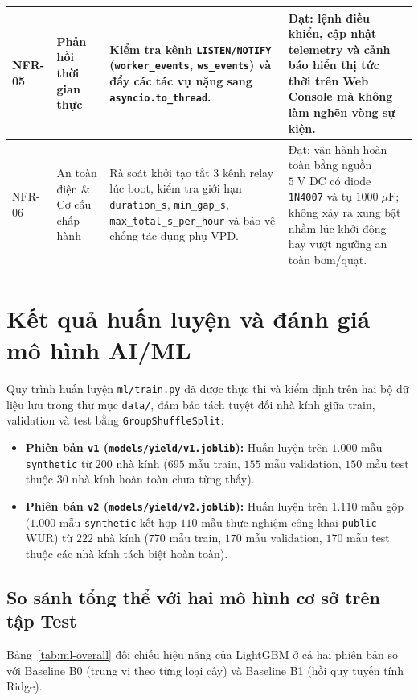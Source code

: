 \begin{longtable}{|>{\centering\arraybackslash}p{}|>{\raggedright\arraybackslash}p{}|>{\raggedright\arraybackslash}p{}|>{\raggedright\arraybackslash}p{}|}
NFR-05 & Phản hồi thời gian thực & Kiểm tra kênh \texttt{LISTEN/NOTIFY} (\texttt{worker\_events}, \texttt{ws\_events}) và đẩy các tác vụ nặng sang \texttt{asyncio.to\_thread}. & Đạt: lệnh điều khiển, cập nhật telemetry và cảnh báo hiển thị tức thời trên Web Console mà không làm nghẽn vòng sự kiện. \\ \hline
NFR-06 & An toàn điện \& Cơ cấu chấp hành & Rà soát khởi tạo tắt 3 kênh relay lúc boot, kiểm tra giới hạn \texttt{duration\_s}, \texttt{min\_gap\_s}, \texttt{max\_total\_s\_per\_hour} và bảo vệ chống tác dụng phụ VPD. & Đạt: vận hành hoàn toàn bằng nguồn \(5\;\text{V DC}\) có diode \texttt{1N4007} và tụ \(1000\;\mu\text{F}\); không xảy ra xung bật nhầm lúc khởi động hay vượt ngưỡng an toàn bơm/quạt. \\ \hline
\end{longtable}
\endgroup

\section{Kết quả huấn luyện và đánh giá mô hình AI/ML}
\label{sec:c4-ml-results}

Quy trình huấn luyện \texttt{ml/train.py} đã được thực thi và kiểm định trên hai bộ dữ liệu lưu trong thư mục \texttt{data/}, đảm bảo tách tuyệt đối nhà kính giữa train, validation và test bằng \texttt{GroupShuffleSplit}:
\begin{itemize}[leftmargin=*]
    \item \textbf{Phiên bản \texttt{v1} (\texttt{models/yield/v1.joblib}):} Huấn luyện trên \(1.000\) mẫu \texttt{synthetic} từ \(200\) nhà kính (\(695\) mẫu train, \(155\) mẫu validation, \(150\) mẫu test thuộc \(30\) nhà kính hoàn toàn chưa từng thấy).
    \item \textbf{Phiên bản \texttt{v2} (\texttt{models/yield/v2.joblib}):} Huấn luyện trên \(1.110\) mẫu gộp (\(1.000\) mẫu \texttt{synthetic} kết hợp \(110\) mẫu thực nghiệm công khai \texttt{public} WUR) từ \(222\) nhà kính (\(770\) mẫu train, \(170\) mẫu validation, \(170\) mẫu test thuộc các nhà kính tách biệt hoàn toàn).
\end{itemize}

\subsection{So sánh tổng thể với hai mô hình cơ sở trên tập Test}
\label{subsec:c4-ml-overall}

Bảng~\ref{tab:ml-overall} đối chiếu hiệu năng của LightGBM ở cả hai phiên bản so với Baseline B0 (trung vị theo từng loại cây) và Baseline B1 (hồi quy tuyến tính Ridge).

